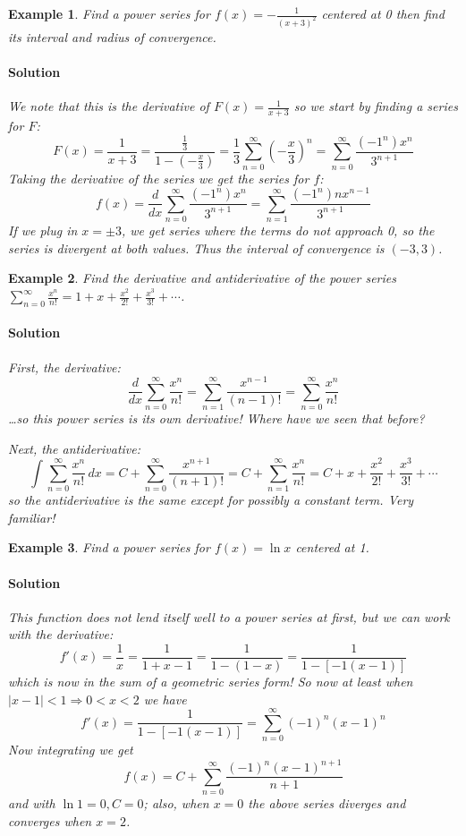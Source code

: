 \documentclass[letterpaper, 11pt, openany]{book}
\theoremstyle{mytheoremstyle}
\theoremstyle{myexamplestyle}
\newtheorem{example}{Example}[section]
\newenvironment{solution}{\paragraph{\sffamily \smaller \fontseries{b}\selectfont Solution}}{\hfill\faSquare}
\begin{document}
\begin{example}\label{e:powseriesintegrate}
    Find a power series for $\displaystyle f(x) = -\frac{1}{(x+3)^{2}}$ centered at 0 then find its interval and radius of convergence.
    \begin{solution}
        We note that this is the derivative of $\displaystyle F(x) = \frac{1}{x+3}$ so we start by finding a series for $F$:
        \[F(x) = \frac{1}{x+3} = \frac{\frac{1}{3}}{1-(-\frac{x}{3})} = \frac{1}{3} \sum_{n=0}^{\infty} \left( -\frac{x}{3} \right)^{n} = \sum_{n=0}^{\infty} \frac{(-1^{n})x^{n}}{3^{n+1}}\]
        Taking the derivative of the series we get the series for $f$:
        \[f(x) = \frac{d}{dx}\sum_{n=0}^{\infty} \frac{(-1^{n})x^{n}}{3^{n+1}} = \sum_{n=1}^{\infty} \frac{(-1^{n})n x^{n-1}}{3^{n+1}}\]
        If we plug in $x = \pm 3$, we get series where the terms do not approach 0, so the series is divergent at both values. Thus the interval of convergence is $(-3, 3)$.
    \end{solution}
\end{example}

\begin{example}\label{e:powseriesintandderiv}
    Find the derivative and antiderivative of the power series $\displaystyle \sum_{n=0}^{\infty} \frac{x^{n}}{n!} = 1 + x + \frac{x^2}{2!} + \frac{x^{3}}{3!} + \cdots$.
    \begin{solution}
        First, the derivative:
        \[\frac{d}{dx} \sum_{n=0}^{\infty} \frac{x^{n}}{n!} = \sum_{n=1}^{\infty} \frac{x^{n-1}}{(n-1)!} = \sum_{n=0}^{\infty} \frac{x^{n}}{n!}\]
        \ldots so this power series is its own derivative! Where have we seen \textit{that} before?

        Next, the antiderivative:
        \[\int \sum_{n=0}^{\infty} \frac{x^{n}}{n!} \, dx = C + \sum_{n=0}^{\infty} \frac{x^{n+1}}{(n+1)!} = C + \sum_{n=1}^{\infty} \frac{x^{n}}{n!} = C + x + \frac{x^2}{2!} + \frac{x^{3}}{3!} + \cdots\]
        so the antiderivative is the same except for possibly a constant term. \textit{Very} familiar! \faSmile
    \end{solution}
\end{example}

\begin{example}
    Find a power series for \(f(x) = \ln x\) centered at 1.
    \begin{solution}
        This function does not lend itself well to a power series at first, but we can work with the derivative:
        \[f'(x) = \frac{1}{x} = \frac{1}{1+x-1} = \frac{1}{1-(1-x)} = \frac{1}{1-[-1(x-1)]}\]
        which is now in the sum of a geometric series form! So now at least when \(|x-1|<1 \Rightarrow 0 < x < 2\) we have
        \[f'(x) = \frac{1}{1-[-1(x-1)]} = \sum_{n=0}^{\infty} (-1)^{n}(x-1)^{n}\]
        Now integrating we get
        \[f(x) = C + \sum_{n=0}^{\infty} \frac{(-1)^{n}(x-1)^{n+1}}{n+1}\]
        and with \(\ln 1 = 0, C = 0\); also, when \(x = 0\) the above series diverges and converges when \(x=2\).
    \end{solution}
\end{example}
\end{document}
